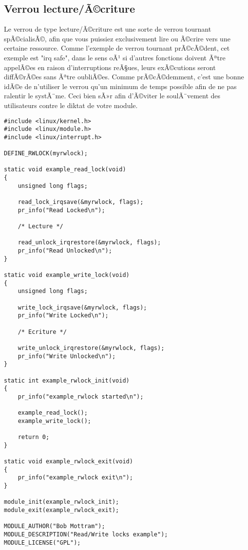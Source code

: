 \documentclass[11pt]{article}
\begin{document}
\subsection*{Verrou lecture/Ã©criture}
\label{sec-12-3}
Le verrou de type lecture/Ã©criture est une sorte de verrou tournant spÃ©cialisÃ©, afin que vous puissiez exclusivement lire ou Ã©crire vers une certaine ressource. Comme l'exemple de verrou tournant prÃ©cÃ©dent, cet exemple est "irq safe", dans le sens oÃ¹ si d'autres fonctions doivent Ãªtre appelÃ©es en raison d'interruptions reÃ§ues, leurs exÃ©cutions seront diffÃ©rÃ©es sans Ãªtre oubliÃ©es. Comme prÃ©cÃ©demment, c'est une bonne idÃ©e de n'utiliser le verrou qu'un minimum de temps possible afin de ne pas ralentir le systÃ¨me. Ceci bien sÃ»r afin d'Ã©viter le soulÃ¨vement des utilisateurs contre le diktat de votre module.

\begin{verbatim}
#include <linux/kernel.h>
#include <linux/module.h>
#include <linux/interrupt.h>

DEFINE_RWLOCK(myrwlock);

static void example_read_lock(void)
{
    unsigned long flags;

    read_lock_irqsave(&myrwlock, flags);
    pr_info("Read Locked\n");

    /* Lecture */

    read_unlock_irqrestore(&myrwlock, flags);
    pr_info("Read Unlocked\n");
}

static void example_write_lock(void)
{
    unsigned long flags;

    write_lock_irqsave(&myrwlock, flags);
    pr_info("Write Locked\n");

    /* Ecriture */

    write_unlock_irqrestore(&myrwlock, flags);
    pr_info("Write Unlocked\n");
}

static int example_rwlock_init(void)
{
    pr_info("example_rwlock started\n");

    example_read_lock();
    example_write_lock();

    return 0;
}

static void example_rwlock_exit(void)
{
    pr_info("example_rwlock exit\n");
}

module_init(example_rwlock_init);
module_exit(example_rwlock_exit);

MODULE_AUTHOR("Bob Mottram");
MODULE_DESCRIPTION("Read/Write locks example");
MODULE_LICENSE("GPL");
\end{verbatim}
\end{document}
